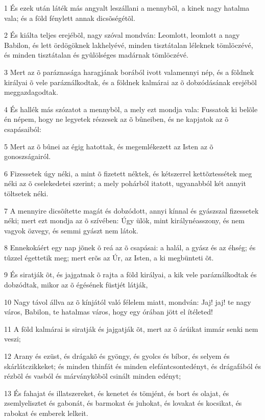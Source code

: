 \par 1 És ezek után láték más angyalt leszállani a mennybõl, a kinek nagy hatalma vala; és a föld fénylett annak dicsõségétõl.
\par 2 És kiálta teljes erejébõl, nagy szóval mondván: Leomlott, leomlott  a nagy Babilon, és lett ördögöknek lakhelyévé, minden tisztátalan léleknek tömlöczévé, és minden tisztátalan és gyûlölséges madárnak tömlöczévé.
\par 3 Mert az õ paráznasága haragjának borából ivott valamennyi nép, és a földnek királyai õ vele paráználkodtak, és a földnek kalmárai az õ dobzódásának erejébõl meggazdagodtak.
\par 4 És hallék más szózatot a mennybõl, a mely ezt mondja vala: Fussatok ki belõle én népem, hogy ne legyetek részesek az õ bûneiben, és ne kapjatok az õ csapásaiból:
\par 5 Mert az õ bûnei az égig hatottak, és megemlékezett az  Isten az õ gonoszságairól.
\par 6 Fizessetek úgy néki, a mint õ fizetett néktek, és kétszerrel kettõztessétek meg néki az õ cselekedetei szerint; a mely pohárból itatott, ugyanabból két annyit töltsetek néki.
\par 7 A mennyire dicsõítette magát és dobzódott, annyi kínnal és gyászszal fizessetek néki; mert ezt mondja az õ szívében: Úgy ülök, mint királynéasszony, és nem vagyok özvegy, és semmi gyászt nem látok.
\par 8 Ennekokáért egy nap jõnek õ reá az õ csapásai: a halál, a gyász és az éhség; és tûzzel  égettetik meg; mert erõs az Úr, az Isten, a ki megbünteti õt.
\par 9 És siratják õt, és jajgatnak õ rajta a föld királyai, a kik vele paráználkodtak és dobzódtak, mikor az õ égésének füstjét látják,
\par 10 Nagy távol állva az õ kínjától való félelem miatt, mondván: Jaj! jaj! te nagy város, Babilon, te hatalmas város, hogy egy órában jött el ítéleted!
\par 11 A föld kalmárai is siratják és jajgatják õt, mert az õ árúikat immár senki nem veszi;
\par 12 Arany és ezüst, és drágakõ és gyöngy, és gyolcs és bíbor, és selyem és skárlátczikkeket; és minden thinfát és minden elefántcsontedényt, és drágafából és rézbõl és vasból és márványkõbõl csinált minden edényt;
\par 13 És fahajat és illatszereket, és kenetet és tömjént, és bort és olajat, és zsemlyelisztet és gabonát, és barmokat és juhokat, és lovakat és kocsikat, és rabokat és emberek lelkeit.
